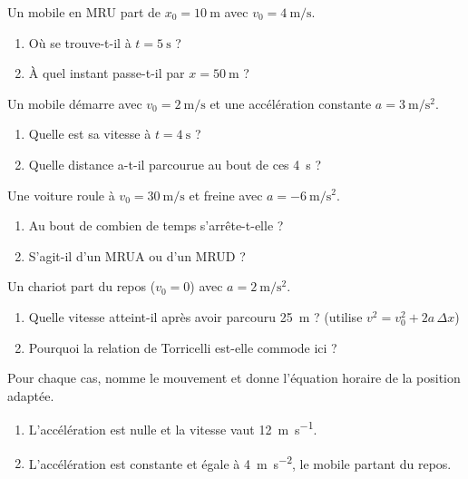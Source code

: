 \documentclass[11pt,a4paper]{article}
\begin{document}

\begin{exo}
Un mobile en MRU part de $x_0=\qty{10}{\metre}$ avec $v_0=\qty{4}{\metre\per\second}$.
\begin{enumerate}[label=\alph*)]
  \item Où se trouve-t-il à $t=\qty{5}{\second}$ ?
  \item À quel instant passe-t-il par $x=\qty{50}{\metre}$ ?
\end{enumerate}
\end{exo}

\begin{exo}
Un mobile démarre avec $v_0=\qty{2}{\metre\per\second}$ et une accélération constante $a=\qty{3}{\metre\per\second\squared}$.
\begin{enumerate}[label=\alph*)]
  \item Quelle est sa vitesse à $t=\qty{4}{\second}$ ?
  \item Quelle distance a-t-il parcourue au bout de ces \qty{4}{\second} ?
\end{enumerate}
\end{exo}

\begin{exo}
Une voiture roule à $v_0=\qty{30}{\metre\per\second}$ et freine avec $a=\qty{-6}{\metre\per\second\squared}$.
\begin{enumerate}[label=\alph*)]
  \item Au bout de combien de temps s'arrête-t-elle ?
  \item S'agit-il d'un MRUA ou d'un MRUD ?
\end{enumerate}
\end{exo}

\begin{exo}
Un chariot part du repos ($v_0=0$) avec $a=\qty{2}{\metre\per\second\squared}$.
\begin{enumerate}[label=\alph*)]
  \item Quelle vitesse atteint-il après avoir parcouru \qty{25}{\metre} ? (utilise $v^2=v_0^2+2a\,\Delta x$)
  \item Pourquoi la relation de Torricelli est-elle commode ici ?
\end{enumerate}
\end{exo}

\begin{exo}
Pour chaque cas, nomme le mouvement et donne l'équation horaire de la position adaptée.
\begin{enumerate}[label=\alph*)]
  \item L'accélération est nulle et la vitesse vaut \qty{12}{\metre\per\second}.
  \item L'accélération est constante et égale à \qty{4}{\metre\per\second\squared}, le mobile partant du repos.
\end{enumerate}
\end{exo}
\end{document}
